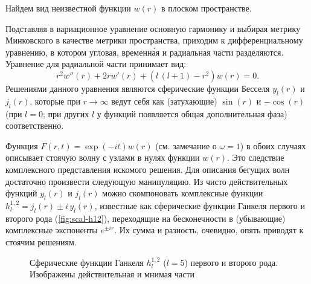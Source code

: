 \documentclass[\docroot/reports/draft/report.tex]{subfiles}
\begin{document}
        Найдем вид неизвестной функции $w(r)$ в плоском пространстве.

        Подставляя в вариационное уравнение основную гармонику и выбирая метрику Минковского в качестве метрики пространства, приходим к дифференциальному уравнению, в котором угловая, временн\'{а}я и радиальная части разделяются. Уравнение для радиальной части принимает вид:
        \begin{equation}\label{eq:scal-m-eq}
            r^2 w''(r) + 2 r w'(r) + (l\,(l+1) - r^2) w(r) = 0.
        \end{equation}
        Решениями данного уравнения являются сферические функции Бесселя $y_l(r)$ и $j_l(r)$, которые при $r\to\infty$ ведут себя как (затухающие) $\sin(r)$ и $-\cos(r)$ (при $l = 0$; при других $l$ у функций появляется общая дополнительная фаза) соответственно.

        Функция $F(r,t) = \exp(-i t) w(r)$ (см. замечание о $\omega = 1$) в обоих случаях описывает стоячую волну с узлами в нулях функции $w(r)$. Это следствие комплексного представления искомого решения. Для описания бегущих волн достаточно произвести следующую манипуляцию. Из чисто действительных функций $y_l(r)$ и $j_l(r)$ можно скомпоновать комплексные функции $h^{1,2}_l = j_l(r) \pm i\,y_l(r)$, известные как сферические функции Ганкеля первого и второго рода (\autoref{fig:scal-h12}), переходящие на бесконечности в (убывающие) комплексные экспоненты $e^{\pm i r}$. Их сумма и разность, очевидно, опять приводят к стоячим решениям.
        \begin{figure}[h]
            \centering
            \hspace{8pt}%
            \hspace{8pt}%
            \caption[]{Сферические функции Ганкеля $h^{1,2}_l$ ($l=5$)  первого и  второго рода. Изображены действительная и мнимая части}%
            \label{fig:scal-h12}%
        \end{figure}
\end{document}
